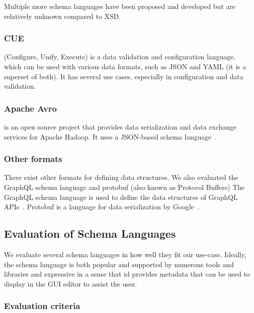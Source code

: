 Multiple more schema languages have been proposed and developed but are relatively unknown compared to XSD\cite{xml_schemas_1,xml_schemas_2}.

\subsubsection{CUE}\cite{cuelang} %
(Configure, Unify, Execute) is a data validation and configuration language, which can be used with various data formats, such as JSON and YAML (it is a superset of both).
It has several use cases, especially in configuration and data validation.


\subsubsection{Apache Avro}%
is an open source project that provides data serialization and data exchange services for Apache Hadoop.
It uses a JSON-based schema language~\cite{Apache-Avro}.


\subsubsection{Other formats}

There exist other formats for defining data structures.
We also evaluated the GraphQL schema language and protobuf (also known as Protocol Buffers)
The GraphQL schema language is used to define the data structures of GraphQL APIs~\cite{graphQL}.
Protobuf is a language for data serialization by Google~\cite{protobufProtocolBuffers}.


\subsection{Evaluation of Schema Languages}\label{subsec:evaluation-of-schema-languages}



We evaluate several schema languages in how well they fit our use-case.
Ideally, the schema language is both popular and supported by numerous tools and libraries and expressive in a sense that id provides metadata that can be used to display in the GUI editor to assist the user.

\subsubsection{Evaluation criteria} %

